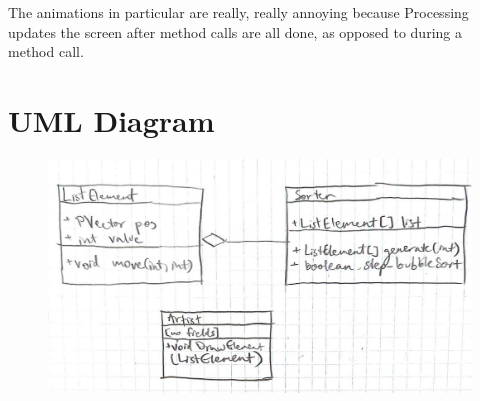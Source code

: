 \documentclass{scrartcl}
\begin{document}
The animations in particular are really, really annoying because
Processing updates the screen after method calls are all done,
as opposed to during a method call.

\section{UML Diagram}
\begin{figure}[h]
	\centering
	\includegraphics[width=0.8\linewidth]{UML_v2}
\end{figure}
\end{document}
